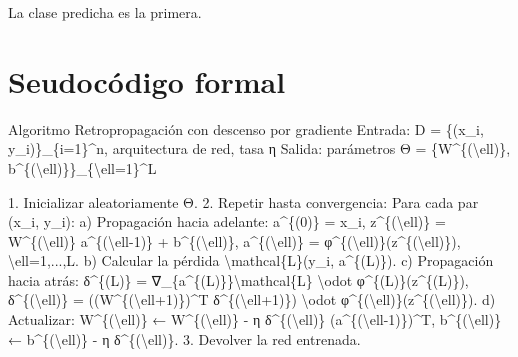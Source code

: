 \documentclass[
  spanish,
  10.5pt,
  letterpaper,
  DIV=11,
  numbers=noendperiod,
  oneside,
  open=any]{scrreprt}
\newenvironment{Shaded}{\begin{snugshade}}{\end{snugshade}}
\newcommand{\NormalTok}[1]{\textcolor[rgb]{0.00,0.23,0.31}{#1}}
\theoremstyle{definition}
\theoremstyle{definition}
\theoremstyle{plain}
\theoremstyle{remark}
\begin{document}
La clase predicha es la primera.

\section*{Seudocódigo formal}\label{seudocuxf3digo-formal-7}


\begin{tcolorbox}[enhanced jigsaw, arc=.35mm, bottomrule=.15mm, bottomtitle=1mm, breakable, colback=white, colbacktitle=quarto-callout-note-color!10!white, colframe=quarto-callout-note-color-frame, coltitle=black, left=2mm, leftrule=.75mm, opacityback=0, opacitybacktitle=0.6, rightrule=.15mm, title=\textcolor{quarto-callout-note-color}{\faInfo}\hspace{0.5em}{Seudocódigo matemático formal}, titlerule=0mm, toprule=.15mm, toptitle=1mm]

\begin{Shaded}
\begin{Highlighting}[numbers=left,,]
\NormalTok{Algoritmo Retropropagación con descenso por gradiente}
\NormalTok{Entrada:}
\NormalTok{  D = \{(x\_i, y\_i)\}\_\{i=1\}\^{}n, arquitectura de red, tasa η}
\NormalTok{Salida:}
\NormalTok{  parámetros Θ = \{W\^{}\{(\textbackslash{}ell)\}, b\^{}\{(\textbackslash{}ell)\}\}\_\{\textbackslash{}ell=1\}\^{}L}

\NormalTok{1. Inicializar aleatoriamente Θ.}
\NormalTok{2. Repetir hasta convergencia:}
\NormalTok{   Para cada par (x\_i, y\_i):}
\NormalTok{   a) Propagación hacia adelante:}
\NormalTok{         a\^{}\{(0)\} = x\_i,}
\NormalTok{         z\^{}\{(\textbackslash{}ell)\} = W\^{}\{(\textbackslash{}ell)\} a\^{}\{(\textbackslash{}ell{-}1)\} + b\^{}\{(\textbackslash{}ell)\},}
\NormalTok{         a\^{}\{(\textbackslash{}ell)\} = φ\^{}\{(\textbackslash{}ell)\}(z\^{}\{(\textbackslash{}ell)\}),   \textbackslash{}ell=1,...,L.}
\NormalTok{   b) Calcular la pérdida \textbackslash{}mathcal\{L\}(y\_i, a\^{}\{(L)\}).}
\NormalTok{   c) Propagación hacia atrás:}
\NormalTok{         δ\^{}\{(L)\} = ∇\_\{a\^{}\{(L)\}\}\textbackslash{}mathcal\{L\} \textbackslash{}odot φ\textquotesingle{}\^{}\{(L)\}(z\^{}\{(L)\}),}
\NormalTok{         δ\^{}\{(\textbackslash{}ell)\} = ((W\^{}\{(\textbackslash{}ell+1)\})\^{}T δ\^{}\{(\textbackslash{}ell+1)\}) \textbackslash{}odot φ\textquotesingle{}\^{}\{(\textbackslash{}ell)\}(z\^{}\{(\textbackslash{}ell)\}).}
\NormalTok{   d) Actualizar:}
\NormalTok{         W\^{}\{(\textbackslash{}ell)\} ← W\^{}\{(\textbackslash{}ell)\} {-} η δ\^{}\{(\textbackslash{}ell)\} (a\^{}\{(\textbackslash{}ell{-}1)\})\^{}T,}
\NormalTok{         b\^{}\{(\textbackslash{}ell)\} ← b\^{}\{(\textbackslash{}ell)\} {-} η δ\^{}\{(\textbackslash{}ell)\}.}
\NormalTok{3. Devolver la red entrenada.}
\end{Highlighting}
\end{Shaded}

\end{tcolorbox}
\end{document}
